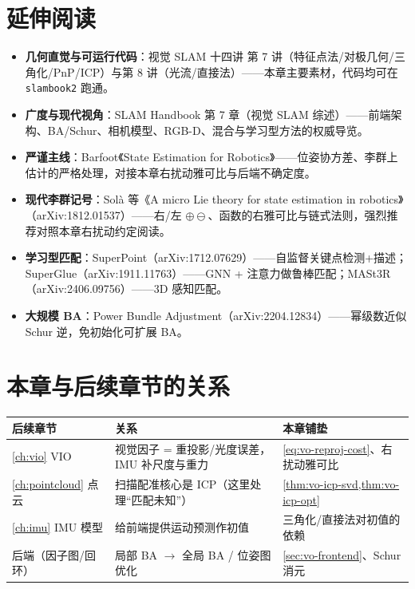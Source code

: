 \section*{延伸阅读}
\begin{itemize}
  \item \textbf{几何直觉与可运行代码}：视觉 SLAM 十四讲\cite{gaoxiang2019slam14} 第 7 讲（特征点法/对极几何/三角化/PnP/ICP）与第 8 讲（光流/直接法）——本章主要素材，代码均可在 \texttt{slambook2} 跑通。
  \item \textbf{广度与现代视角}：SLAM Handbook\cite{carlone2026handbook} 第 7 章（视觉 SLAM 综述）——前端架构、BA/Schur、相机模型、RGB-D、混合与学习型方法的权威导览。
  \item \textbf{严谨主线}：Barfoot《State Estimation for Robotics》\cite{barfoot2024state}——位姿协方差、李群上估计的严格处理，对接本章右扰动雅可比与后端不确定度。
  \item \textbf{现代李群记号}：Solà 等《A micro Lie theory for state estimation in robotics》\cite{sola2018micro}（arXiv:1812.01537）——右/左 $\oplus\ominus$、函数的右雅可比与链式法则，强烈推荐对照本章右扰动约定阅读。
  \item \textbf{学习型匹配}：SuperPoint（arXiv:1712.07629）——自监督关键点检测+描述；SuperGlue（arXiv:1911.11763）——GNN + 注意力做鲁棒匹配；MASt3R（arXiv:2406.09756）——3D 感知匹配。
  \item \textbf{大规模 BA}：Power Bundle Adjustment（arXiv:2204.12834）——幂级数近似 Schur 逆，免初始化可扩展 BA。
\end{itemize}

\section*{本章与后续章节的关系}
\begin{table}[H]\centering\small
\begin{tabular}{lll}
\toprule
后续章节 & 关系 & 本章铺垫 \\
\midrule
\cref{ch:vio} VIO & 视觉因子 = 重投影/光度误差，IMU 补尺度与重力 & \cref{eq:vo-reproj-cost}、右扰动雅可比 \\
\cref{ch:pointcloud} 点云 & 扫描配准核心是 ICP（这里处理“匹配未知”） & \cref{thm:vo-icp-svd,thm:vo-icp-opt} \\
\cref{ch:imu} IMU 模型 & 给前端提供运动预测作初值 & 三角化/直接法对初值的依赖 \\
后端（因子图/回环） & 局部 BA $\to$ 全局 BA / 位姿图优化 & \cref{sec:vo-frontend}、Schur 消元 \\
\bottomrule
\end{tabular}
\end{table}

